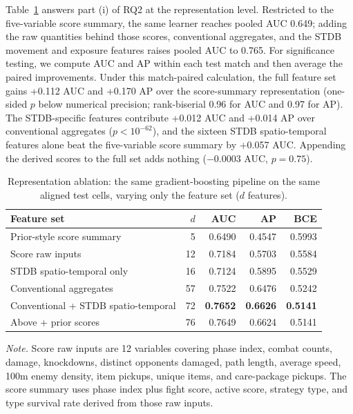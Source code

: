 Table~\ref{tab:feature-ablation} answers part (i) of RQ2 at the
representation level. Restricted to the five-variable score summary, the same
learner reaches pooled AUC 0.649; adding the raw quantities behind those
scores, conventional aggregates, and the STDB movement and exposure features
raises pooled AUC to 0.765. For significance testing, we compute AUC and AP
within each test match and then average the paired improvements. Under this
match-paired calculation, the full feature set gains +0.112 AUC and +0.170 AP
over the score-summary representation (one-sided \(p\) below numerical
precision; rank-biserial 0.96 for AUC and 0.97 for AP). The STDB-specific
features contribute +0.012 AUC and +0.014 AP over conventional aggregates
(\(p<10^{-62}\)), and the sixteen STDB spatio-temporal features alone beat
the five-variable score summary by +0.057 AUC. Appending the derived scores
to the full set adds nothing (\(-0.0003\) AUC, \(p=0.75\)).

\begin{table}[t]
\centering
\caption{Representation ablation: the same gradient-boosting pipeline on the
same aligned test cells, varying only the feature set (\(d\) features).}
\label{tab:feature-ablation}
\small
\begin{tabular}{lrrrr}
\toprule
Feature set & \(d\) & AUC & AP & BCE \\
\midrule
Prior-style score summary & 5 & 0.6490 & 0.4547 & 0.5993 \\
Score raw inputs & 12 & 0.7184 & 0.5703 & 0.5584 \\
STDB spatio-temporal only & 16 & 0.7124 & 0.5895 & 0.5529 \\
Conventional aggregates & 57 & 0.7522 & 0.6476 & 0.5242 \\
Conventional + STDB spatio-temporal & 72 & \textbf{0.7652} & \textbf{0.6626} & \textbf{0.5141} \\
Above + prior scores & 76 & 0.7649 & 0.6624 & 0.5141 \\
\bottomrule
\end{tabular}
\vspace{2pt}
\begin{minipage}{0.96\linewidth}
\footnotesize
\textit{Note.} Score raw inputs are 12 variables covering phase index, combat
counts, damage, knockdowns, distinct opponents damaged, path length, average
speed, 100m enemy density, item pickups, unique items, and care-package
pickups. The score summary uses phase index plus fight score, active score,
strategy type, and type survival rate derived from those raw inputs.
\end{minipage}
\end{table}

